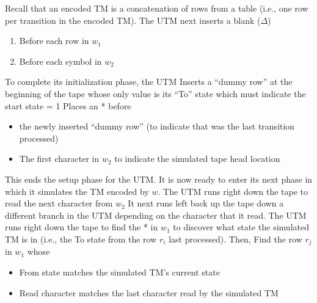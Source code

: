 \documentclass{report}
\begin{document}
\begin{itemize}
\begin{enumerate}
            \end{enumerate}
            \bigbreak \noindent 
            Recall that an encoded TM is a concatenation of rows from a table (i.e., one row per transition in the encoded TM).
            \bigbreak \noindent 
            The UTM next inserts a blank ($\Delta$)
            \begin{enumerate}
                \item Before each row in $w_{1}$
                \item Before each symbol in $w_{2}$
            \end{enumerate}
            \bigbreak \noindent 
            \bigbreak \noindent 
            To complete its initialization phase, the UTM Inserts a “dummy row” at the beginning of the tape whose only value is its “To” state which must indicate the start state = 1
            \bigbreak \noindent 
            Places an * before
            \begin{itemize}
                \item the newly inserted “dummy row” (to indicate that was the last transition processed)
                \item The first character in $w_{2}$ to indicate the simulated tape head location
            \end{itemize}
            \bigbreak \noindent 
            This ends the setup phase for the UTM. It is now ready to enter its next phase in which it simulates the TM encoded by $w$.
            \bigbreak \noindent 
            The UTM runs right down the tape to read the next character from $w_{2}$
            \bigbreak \noindent 
            It next runs left back up the tape down a different branch in the UTM depending on the character that it read.
            \bigbreak \noindent 
            \bigbreak \noindent 
            The UTM runs right down the tape to find the * in $w_{1}$ to discover what state the simulated TM is in (i.e., the To state from the row $r_{i}$ last processed).
            \bigbreak \noindent 
            Then, Find the row $r_{j}$ in $w_{1}$ whose
            \begin{itemize}
                \item From state matches the simulated TM’s current state
                \item Read character matches the last character read by the simulated TM
            \end{itemize}
            \bigbreak \noindent 

\end{itemize}
\end{document}
